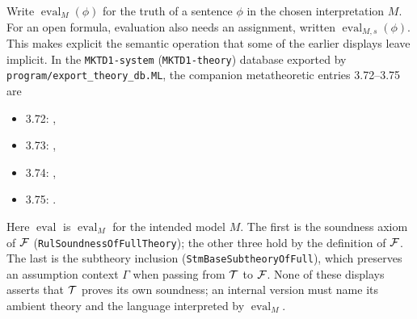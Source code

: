 Write $\operatorname{eval}_M(\phi)$ for the truth of a sentence $\phi$ in the
chosen interpretation $M$. For an open formula, evaluation also needs an
assignment, written $\operatorname{eval}_{M,s}(\phi)$. This makes explicit the
semantic operation that some of the earlier displays leave implicit. In the
\texttt{MKTD1-system} (\texttt{MKTD1-theory}) database exported by
\texttt{program/export\_theory\_db.ML}, the companion metatheoretic entries 3.72--3.75
are
\begin{itemize}
  \item 3.72: ,
  \item 3.73: ,
  \item 3.74: ,
  \item 3.75: .
\end{itemize}
Here $\operatorname{eval}$ is $\operatorname{eval}_M$ for the intended model $M$. The first
is the soundness axiom of ${\mathcal{F}}$ (\texttt{RulSoundnessOfFullTheory}); the other three
hold by the definition of ${\mathcal{F}}$. The last is the subtheory inclusion
(\texttt{StmBaseSubtheoryOfFull}), which preserves an assumption context
$\Gamma$ when passing from $\mathcal{T}$ to ${\mathcal{F}}$. None of these displays asserts that
$\mathcal{T}$ proves its own soundness; an internal version must name its ambient theory
and the language interpreted by $\operatorname{eval}_M$.

